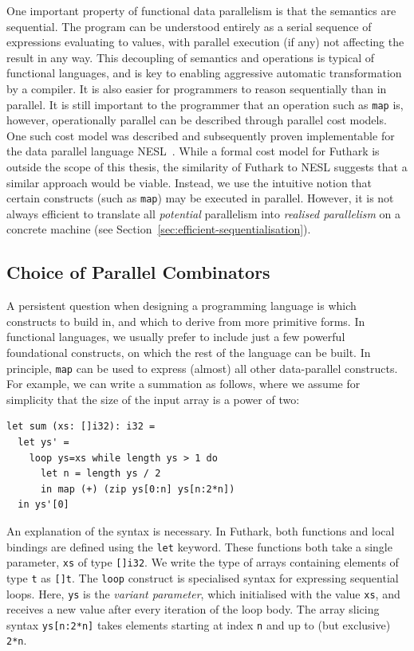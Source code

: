 One important property of functional data parallelism is that the
semantics are sequential.  The program can be understood entirely as a
serial sequence of expressions evaluating to values, with parallel
execution (if any) not affecting the result in any way.  This
decoupling of semantics and operations is typical of functional
languages, and is key to enabling aggressive automatic transformation
by a compiler.  It is also easier for programmers to reason
sequentially than in parallel.  It is still important to the
programmer that an operation such as \lstinline{map} is, however,
operationally parallel can be described through parallel cost models.
One such cost model was described and subsequently proven
implementable for the data parallel language
NESL~\cite{Blelloch:1996:PTS:232627.232650}.  While a formal cost
model for Futhark is outside the scope of this thesis, the similarity
of Futhark to NESL suggests that a similar approach would be viable.
Instead, we use the intuitive notion that certain constructs (such as
\lstinline{map}) may be executed in parallel.  However, it is not
always efficient to translate all \textit{potential} parallelism into
\textit{realised parallelism} on a concrete machine (see
Section~\ref{sec:efficient-sequentialisation}).

\subsection{Choice of Parallel Combinators}
\label{sec:choice-of-parallel-combinators}

A persistent question when designing a programming language is which
constructs to build in, and which to derive from more primitive forms.
In functional languages, we usually prefer to include just a few
powerful foundational constructs, on which the rest of the language
can be built.  In principle, \lstinline{map} can be used to express
(almost) all other data-parallel constructs.  For example, we can
write a summation as follows, where we assume for simplicity that the
size of the input array is a power of two:

\begin{lstlisting}
let sum (xs: []i32): i32 =
  let ys' =
    loop ys=xs while length ys > 1 do
      let n = length ys / 2
      in map (+) (zip ys[0:n] ys[n:2*n])
  in ys'[0]
\end{lstlisting}

An explanation of the syntax is necessary.  In Futhark, both functions
and local bindings are defined using the \lstinline{let} keyword.
These functions both take a single parameter, \lstinline{xs} of type
\lstinline{[]i32}.  We write the type of arrays containing elements of
type \lstinline{t} as \lstinline{[]t}.  The \lstinline{loop} construct
is specialised syntax for expressing sequential loops.  Here,
\lstinline{ys} is the \textit{variant parameter}, which initialised
with the value \lstinline{xs}, and receives a new value after every
iteration of the loop body.  The array slicing syntax
\lstinline{ys[n:2*n]} takes elements starting at index \lstinline{n}
and up to (but exclusive) \lstinline{2*n}.

